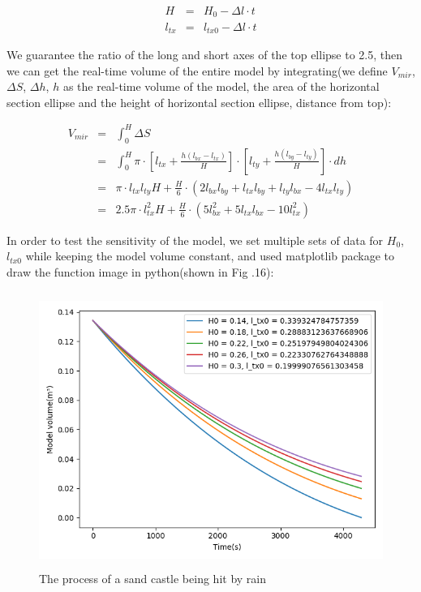\documentclass[13pt]{ctexart}
\begin{document}
	\begin{eqnarray}
	H &=& H_0 - {\Delta}l \cdot t\\
	l_{tx} &=& l_{tx0} - {\Delta}l \cdot t
	\end{eqnarray}
	
	We guarantee the ratio of the long and short axes of the top ellipse to 2.5, then we can get the real-time volume of the entire model by integrating(we define $V_{mir}$, ${\Delta}S$, ${\Delta}h$, $h$ as the real-time volume of the model, the area of the horizontal section ellipse and the height of horizontal section ellipse, distance from top):
	
	\begin{eqnarray}
	V_{mir} &=& \int_{0}^{H} {\Delta}S \nonumber \\
	&=& \int_{0}^{H} {\pi \cdot [l_{tx} + \frac{h (l_{bx} - l_{tx})}{H}] \cdot [l_{ty} + \frac{h (l_{by} - l_{ty})}{H}]} \cdot dh \nonumber \\
	&=& \pi \cdot l_{tx} l_{ty} H + \frac{H}{6} \cdot (2 l_{bx} l_{by} + l_{tx} l_{by} + l_{ty} l_{bx} - 4 l_{tx} l_{ty}) \nonumber \\
	&=& 2.5\pi \cdot l_{tx}^2 H + \frac{H}{6} \cdot (5 l_{bx}^2 + 5l_{tx}l_{bx} - 10 l_{tx}^2)
	\end{eqnarray}
	
	In order to test the sensitivity of the model, we set multiple sets of data for $H_0$, $l_{tx0}$ while keeping the model volume constant, and used matplotlib package to draw the function image in python(shown in Fig .16):
	
	\begin {figure}[h]
	\centering %
	\includegraphics[width=12cm,height=9cm]{rain.png}
	\caption{The process of a sand castle being hit by rain} %
	\label{spread_rate}
	\end {figure}
	
\end{document}
